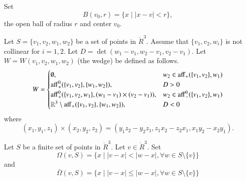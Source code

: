\begin{tarskidata}
\begin{tarski}
\begin{definition}[ball,~B]
Set 
$$
B(v_0,r) = \{ x\mid |x - v| < r \},
$$
the open ball of radius $r$ and center $v_0$.
\end{definition}
\end{tarski}

\begin{tarski}

\begin{definition}[wedge,~W]
Let $S=\{v_1,v_2,w_1,w_2\}$ be a set of points in
$\ring{R}^3$.  Assume that $\{v_1,v_2,w_i\}$ is not collinear
for $i=1,2$. Let $D = \det(w_1-v_1,w_2-v_1,v_2-v_1)$.  
Let $W = W(v_1,v_2,w_1,w_2)$ (the wedge) be defined
as follows.  
$$
W=\begin{cases}
\emptyset,& w_2\in {\operatorname{aff}}_+(\{v_1,v_2\},w_1)\\
{\operatorname{aff}}_+^0(\{v_1,v_2\},\{w_1,w_2\}),& D > 0\\
{\operatorname{aff}}_+^0(\{v_1,v_2,w_1\},(w_1-v_1)\times (v_2-v_1)),&
    w_2\in{\operatorname{aff}}_-^0(\{v_1,v_2\},w_1)\\
\mathbb{R}^3\setminus{\operatorname{aff}}_+(\{v_1,v_2\},\{w_1,w_2\}),& D < 0\\
\end{cases}
$$
where 
$$
(x_1,y_1,z_1)\times (x_2,y_2,z_2) = 
(y_1 z_2 - y_2 z_1, z_1 x_2 - z_2 x_1, x_1 y_2 - x_2 y_1).
$$
\end{definition}
\end{tarski}

\begin{tarski}

\begin{definition} 
Let $S$ be a finite set of points in 
$\ring{R}^3$.  Let $v\in\ring{R}^3$. Set
  $$
  \Omega(v,S) = \{x \mid |v-x| < |w-x|, \forall w\in S\setminus\{v\}\}
  $$
and
  $$
  \bar\Omega(v,S) = \{x \mid |v-x| \le |w-x|, \forall w\in S\setminus\{v\}\}
  $$
\end{definition}
\end{tarski}
	

\end{tarskidata}
